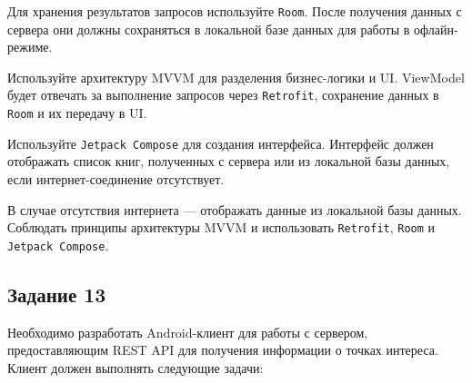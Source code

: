 \documentclass[a4paper,12pt]{article}
\begin{document}
Для хранения результатов запросов используйте \texttt{Room}. После получения данных с сервера они должны сохраняться в локальной базе данных для работы в офлайн-режиме.

Используйте архитектуру MVVM для разделения бизнес-логики и UI. ViewModel будет отвечать за выполнение запросов через \texttt{Retrofit}, сохранение данных в \texttt{Room} и их передачу в UI.

Используйте \texttt{Jetpack Compose} для создания интерфейса. Интерфейс должен отображать список книг, полученных с сервера или из локальной базы данных, если интернет-соединение отсутствует.

В случае отсутствия интернета — отображать данные из локальной базы данных.
Соблюдать принципы архитектуры MVVM и использовать \texttt{Retrofit}, \texttt{Room} и \texttt{Jetpack Compose}.

\subsection*{Задание 13}

Необходимо разработать Android-клиент для работы с сервером, предоставляющим REST API для получения информации о точках интереса. Клиент должен выполнять следующие задачи:

\end{document}
